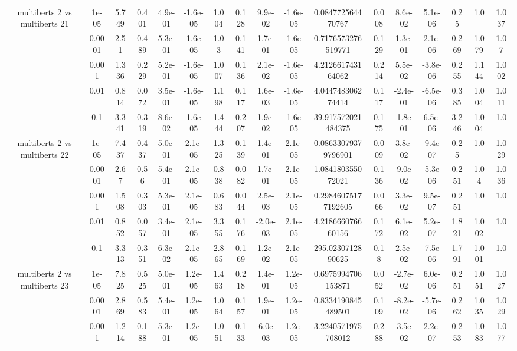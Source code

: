 \begin{tabular}{|c|c|c|c|c|c|c|c|c|c|c|c|c|c|c|c|c|}
\hline
\multirow{5}{*}{multiberts 2 vs multiberts 21} & 1e-05 & 5.749 & 0.401 & 4.9e-01 & -1.6e-05 & 1.004 & 0.128 & 9.9e-02 & -1.6e-05 & 0.084772564470767 & 0.008 & 8.6e-02 & 5.1e-06 & 0.25 & 1.0 & 1.037 \\
 & 0.0001 & 2.51 & 0.489 & 5.3e-01 & -1.6e-05 & 1.03 & 0.141 & 1.7e-01 & -1.6e-05 & 0.7176573276519771 & 0.129 & 1.3e-01 & 2.1e-06 & 0.269 & 1.079 & 1.07 \\
 & 0.001 & 1.336 & 0.229 & 5.2e-01 & -1.6e-05 & 1.007 & 0.136 & 2.1e-02 & -1.6e-05 & 4.212661743164062 & 0.214 & 5.5e-02 & -3.8e-06 & 0.255 & 1.144 & 1.002 \\
 & 0.01 & 0.814 & 0.072 & 3.5e-01 & -1.6e-05 & 1.198 & 0.117 & 1.6e-03 & -1.6e-05 & 4.044748306274414 & 0.117 & -2.4e-01 & -6.5e-06 & 0.385 & 1.004 & 1.011 \\
 & 0.1 & 3.341 & 0.319 & 8.6e-02 & -1.6e-05 & 1.444 & 0.207 & 1.9e-02 & -1.6e-05 & 39.917572021484375 & 0.175 & -1.8e-01 & 6.5e-06 & 3.246 & 1.004 & 1.0 \\
\hline
\multirow{5}{*}{multiberts 2 vs multiberts 22} & 1e-05 & 7.437 & 0.437 & 5.0e-01 & 2.1e-05 & 1.325 & 0.139 & 1.4e-01 & 2.1e-05 & 0.08633079379796901 & 0.009 & 3.8e-02 & -9.4e-07 & 0.25 & 1.0 & 1.029 \\
 & 0.0001 & 2.67 & 0.56 & 5.4e-01 & 2.1e-05 & 0.838 & 0.082 & 1.7e-01 & 2.1e-05 & 1.084180355072021 & 0.136 & -9.0e-02 & -5.3e-06 & 0.251 & 1.04 & 1.036 \\
 & 0.001 & 1.508 & 0.303 & 5.3e-01 & 2.1e-05 & 0.683 & 0.044 & 2.5e-03 & 2.1e-05 & 0.29846075177192605 & 0.066 & 3.3e-02 & 9.5e-07 & 0.251 & 1.0 & 1.0 \\
 & 0.01 & 0.852 & 0.057 & 3.4e-01 & 2.1e-05 & 3.355 & 0.176 & -2.0e-03 & 2.1e-05 & 4.218666076660156 & 0.172 & 6.1e-02 & 5.2e-07 & 1.821 & 1.002 & 1.0 \\
 & 0.1 & 3.313 & 0.351 & 6.3e-02 & 2.1e-05 & 2.865 & 0.169 & 1.2e-02 & 2.1e-05 & 295.0230712890625 & 0.18 & 2.5e-02 & -7.5e-06 & 1.791 & 1.001 & 1.0 \\
\hline
\multirow{5}{*}{multiberts 2 vs multiberts 23} & 1e-05 & 7.825 & 0.525 & 5.0e-01 & 1.2e-05 & 1.463 & 0.218 & 1.4e-01 & 1.2e-05 & 0.6975994706153871 & 0.052 & -2.7e-02 & 6.0e-06 & 0.251 & 1.051 & 1.027 \\
 & 0.0001 & 2.869 & 0.583 & 5.4e-01 & 1.2e-05 & 1.064 & 0.157 & 1.9e-01 & 1.2e-05 & 0.8334190845489501 & 0.109 & -8.2e-02 & -5.7e-06 & 0.262 & 1.035 & 1.029 \\
 & 0.001 & 1.214 & 0.188 & 5.3e-01 & 1.2e-05 & 1.051 & 0.133 & -6.0e-03 & 1.2e-05 & 3.2240571975708012 & 0.288 & -3.5e-02 & 2.2e-07 & 0.253 & 1.083 & 1.077 \\

\end{tabular}
